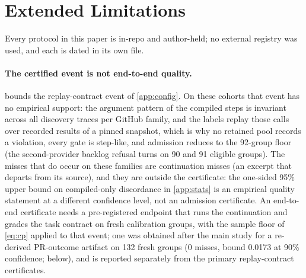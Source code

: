 \begin{table}[t]
  \centering
  \caption{Gate-behavior inventory from the retained threshold analysis. A
  partial frontier would show graded coverage as the threshold changes; none
  appears among the seven artifacts in the retained threshold analysis.}
  \label{tab:gate-profile}
  \footnotesize
  \setlength{\tabcolsep}{4pt}
  
\end{table}

\section{Extended Limitations}
\label{app:limits}

Every protocol in this paper is in-repo and author-held; no external registry
was used, and each is dated in its own file.

\paragraph{The certified event is not end-to-end quality.}
 bounds the replay-contract event of \cref{app:config}.
On these cohorts that event has no empirical support: the argument pattern of
the compiled steps is invariant across all discovery traces per GitHub family,
and the labels replay those calls over recorded results of a pinned snapshot,
which is why no retained pool records a violation, every gate is step-like,
and admission reduces to the 92-group floor (the second-provider backlog
refusal turns on 90 and 91 eligible groups). The misses that do occur on these families are
continuation misses (an excerpt that departs from its source), and they are
outside the certificate: the one-sided 95\% upper bound on compiled-only
discordance in \cref{app:stats} is an empirical quality statement at a
different confidence level, not an admission certificate. An end-to-end
certificate needs a pre-registered endpoint that runs the continuation and
grades the task contract on fresh calibration groups, with the sample floor of
\cref{eq:cp} applied to that event; one was obtained after the main study for a
re-derived PR-outcome artifact on 132 fresh groups (0 misses, bound 0.0173 at
90\% confidence; below), and is reported separately from the primary replay-contract certificates.

